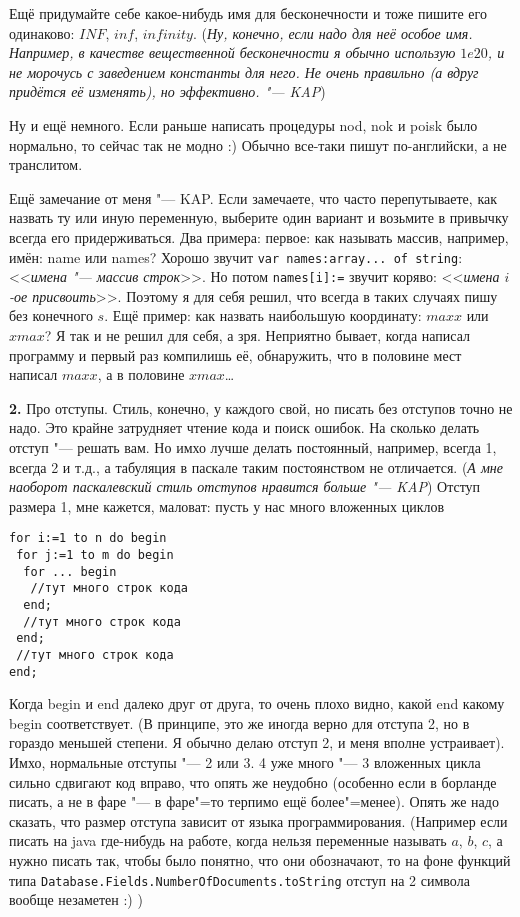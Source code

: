   Ещё придумайте себе какое-нибудь имя для бесконечности и тоже пишите его одинаково: $INF$, $inf$, $infinity$. 
(\textsl{Ну, конечно, если надо для неё особое имя. Например, в качестве вещественной бесконечности 
я обычно использую $1e20$, и не морочусь с заведением константы для него. Не очень правильно (а 
вдруг придётся её изменять), но эффективно. "--- KAP})

  Ну и ещё немного. Если раньше написать процедуры nod, nok и poisk было нормально, то сейчас так не модно :) 
Обычно все-таки пишут по-английски, а не транслитом.

Ещё замечание от меня "--- KAP. Если замечаете, что часто перепутываете, как назвать ту или иную 
переменную, выберите один вариант и возьмите в привычку всегда его придерживаться. Два примера: первое: как 
называть массив, например, имён: name или names? Хорошо звучит \texttt{var names:array... of string}: <<\textit{имена "--- 
массив строк}>>. Но потом \texttt{names[i]:=} звучит коряво: <<\textit{имена $i$-ое присвоить}>>. Поэтому 
я для себя решил, что всегда в таких случаях пишу без конечного $s$. Ещё пример: как назвать 
наибольшую координату: $maxx$ или $xmax$? Я так и не решил для себя, а зря. Неприятно бывает, когда 
написал программу и первый раз компилишь её, обнаружить, что в половине мест написал $maxx$, а в половине 
$xmax$\dots

\textbf{2.} Про отступы. Стиль, конечно, у каждого свой, но писать без отступов точно не надо. Это крайне затрудняет чтение 
кода и поиск ошибок. На сколько делать отступ "--- решать вам. Но имхо лучше делать постоянный, например, всегда 1, 
всегда 2 и т.д., а табуляция в паскале таким постоянством не отличается. (\textsl{А мне наоборот 
паскалевский стиль отступов нравится больше "--- KAP})
Отступ размера 1, мне кажется, маловат: пусть у нас много вложенных циклов
\begin{codesampleo}\begin{verbatim}
for i:=1 to n do begin
 for j:=1 to m do begin
  for ... begin
   //тут много строк кода
  end;
  //тут много строк кода
 end;
 //тут много строк кода
end;    
\end{verbatim}
\end{codesampleo}
Когда begin и end далеко друг от друга, то очень плохо видно, какой end какому begin соответствует. (В принципе, 
это же иногда верно для отступа 2, но в гораздо меньшей степени. Я обычно делаю отступ 2, и меня вполне 
устраивает). Имхо, нормальные отступы "--- 2 или 3. 4 уже много "--- 3 вложенных цикла сильно сдвигают код вправо, 
что опять же неудобно (особенно если в борланде писать, а не в фаре "--- в фаре"=то терпимо ещё более"=менее). 
Опять же надо сказать, что размер отступа зависит от языка программирования. (Например если писать на java 
где-нибудь на работе, когда нельзя переменные называть $a$, $b$, $c$, а нужно писать так, чтобы было понятно, что они 
обозначают, то на фоне функций типа \texttt{Database.Fields.NumberOfDocuments.toString} отступ на 2 символа вообще 
незаметен :) )

